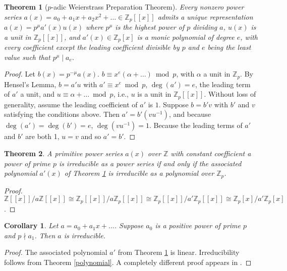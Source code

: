 \documentclass{article}
\newtheorem{theorem}{Theorem}
\newtheorem{corollary}{Corollary}
\begin{document}
\begin{theorem}[$p$-adic Weierstrass Preparation Theorem] \label{preparation}
Every nonzero power series $a(x) = a_0 + a_1x + a_2x^2 + \ldots \in \mathbb{Z}_p[[x]]$ admits a unique representation $a(x) = p^\mu a'(x)u(x)$ where $p^\mu$ is the highest power of $p$ dividing $a$, $u(x)$ is a unit in $\mathbb{Z}_p[[x]]$, and $a'(x) \in \mathbb{Z}_p[x]$ is a monic polynomial of degree $e$, with every coefficient except the leading coefficient divisible by $p$ and $e$ being the least value such that $p^\mu \mid a_e$.
\end{theorem}
\begin{proof}
Let $b(x) = p^{-\mu}a(x)$.  $b \equiv x^e(\alpha + \ldots) \bmod p$, with $\alpha$ a unit in $\mathbb{Z}_p$. By Hensel's Lemma, $b = a'u$ with $a' \equiv x^e \bmod p$, $\deg(a') = e$, the leading term of $a'$ a unit, and $u \equiv \alpha + \ldots \bmod p$, i.e., $u$ is a unit in $\mathbb{Z}_p[[x]]$.  Without loss of generality, assume the leading coefficient of $a'$ is $1$.  Suppose $b = b'v$ with $b'$ and $v$ satisfying the conditions above.  Then $a' = b'(vu^{-1})$, and because $\deg(a') = \deg(b') = e$,
$\deg(vu^{-1}) = 1$.  Because the leading terms of $a'$ and $b'$ are both 1, $u = v$ and so $a' = b'$.
\end{proof}

\begin{theorem}
A primitive power series $a(x)$ over $\mathbb{Z}$ with constant coefficient a power of prime $p$ is irreducible as a power series if and only if the associated polynomial $a'(x)$ of Theorem \ref{preparation} is irreducible as a polynomial over $\mathbb{Z}_p$.
\end{theorem} \label{polynomial}
\begin{proof}
$\mathbb{Z}[[x]]/a\mathbb{Z}[[x]] \cong \mathbb{Z}_p[[x]]/a\mathbb{Z}_p[[x]] \cong \mathbb{Z}_p[[x]]/ a'\mathbb{Z}_p[[x]] \cong \mathbb{Z}_p[x]/a'\mathbb{Z}_p[x]$.
\end{proof}

\begin{corollary}
Let $a = a_0 + a_1x + \ldots$.  Suppose $a_0$ is a positive power of prime $p$ and $p \nmid a_1$.  Then $a$ is irreducible.
\end{corollary}
\begin{proof}
The associated polynomial $a'$ from Theorem \ref{preparation} is linear.  Irreducibility follows from Theorem \ref{polynomial}.  A completely different proof appears in \cite{integerpowerseries_MR2416254}.
\end{proof}
\end{document}
